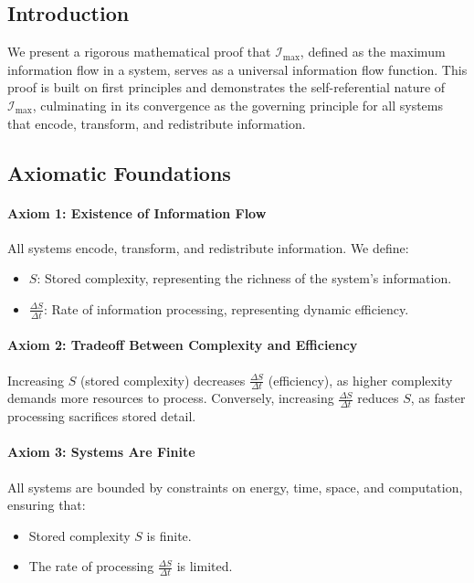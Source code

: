 \documentclass[12pt]{article}
\begin{document}
\subsection{Introduction}
We present a rigorous mathematical proof that \(\mathcal{I}_{\text{max}}\), defined as the maximum information flow in a system, serves as a universal information flow function. This proof is built on first principles and demonstrates the self-referential nature of \(\mathcal{I}_{\text{max}}\), culminating in its convergence as the governing principle for all systems that encode, transform, and redistribute information.

\subsection{Axiomatic Foundations}

\paragraph{Axiom 1: Existence of Information Flow}
All systems encode, transform, and redistribute information. We define:
\begin{itemize}
    \item \(S\): Stored complexity, representing the richness of the system's information.
    \item \(\frac{\Delta S}{\Delta t}\): Rate of information processing, representing dynamic efficiency.
\end{itemize}

\paragraph{Axiom 2: Tradeoff Between Complexity and Efficiency}
Increasing \(S\) (stored complexity) decreases \(\frac{\Delta S}{\Delta t}\) (efficiency), as higher complexity demands more resources to process. Conversely, increasing \(\frac{\Delta S}{\Delta t}\) reduces \(S\), as faster processing sacrifices stored detail.

\paragraph{Axiom 3: Systems Are Finite}
All systems are bounded by constraints on energy, time, space, and computation, ensuring that:
\begin{itemize}
    \item Stored complexity \(S\) is finite.
    \item The rate of processing \(\frac{\Delta S}{\Delta t}\) is limited.
\end{itemize}
\end{document}
